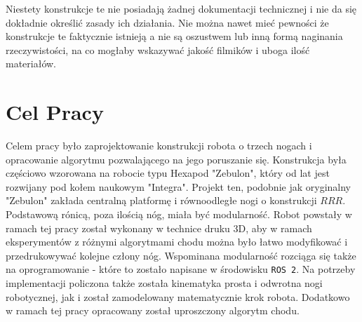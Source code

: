 Niestety konstrukcje te nie posiadają żadnej dokumentacji technicznej i nie da się dokładnie określić zasady ich działania. Nie można nawet mieć pewności że konstrukcje te faktycznie istnieją a nie są oszustwem lub inną formą naginania rzeczywistości, na co mogłaby wskazywać jakość filmików i uboga ilość materiałów.\\

\section{Cel Pracy}
Celem pracy było zaprojektowanie konstrukcji robota o trzech nogach i opracowanie algorytmu pozwalającego na jego poruszanie się. Konstrukcja była częściowo wzorowana na robocie typu Hexapod "Zebulon", który od lat jest rozwijany pod kołem naukowym "Integra". Projekt ten, podobnie jak oryginalny "Zebulon" zakłada centralną platformę i równoodległe nogi o konstrukcji $RRR$. \cite{zebulon_par} Podstawową rónicą, poza ilością nóg, miała być modularność. Robot powstały w ramach tej pracy został wykonany w technice druku 3D, aby w ramach eksperymentów z różnymi algorytmami chodu można było łatwo modyfikować i przedrukowywać kolejne człony nóg. Wspominana modularność rozciąga się także na oprogramowanie - które to zostało napisane w środowisku \texttt{ROS 2}. Na potrzeby implementacji policzona także została kinematyka prosta i odwrotna nogi robotycznej, jak i został zamodelowany matematycznie krok robota. Dodatkowo w ramach tej pracy opracowany został uproszczony algorytm chodu.
